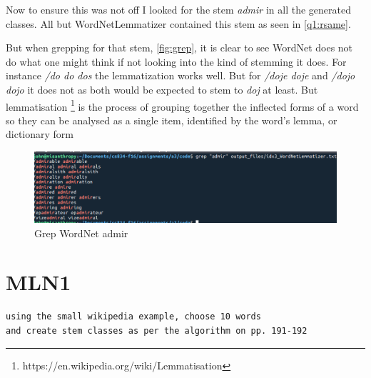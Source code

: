 \documentclass[11pt]{article}
\newenvironment{code}{\captionsetup{type=listing}}{}
\begin{document}

Now to ensure this was not off I looked for the stem \textit{admir} in all the generated classes. All but WordNetLemmatizer contained this stem as seen in \autoref{q1:rsame}.

But when grepping for that stem, \autoref{fig:grep}, it is clear to see WordNet does not do what one might think if not looking into the kind of stemming it does. For instance \textit{/do do dos} the lemmatization works well. But for \textit{/doje doje} and \textit{/dojo dojo} it does not as both would be expected to stem to \textit{doj} at least. But lemmatisation \footnote{https://en.wikipedia.org/wiki/Lemmatisation} is the process of grouping together the inflected forms of a word so they can be analysed as a single item, identified by the word's lemma, or dictionary form  
\begin{figure}[H]
\centering
\includegraphics[scale=0.5]{grepOutput.png}
\caption{Grep WordNet admir}
\label{fig:grep}
\end{figure}
\newpage
\begin{code}
 \label{code:idxr}
\end{code}
\begin{code}
 \label{code:scd}
\end{code}
\newpage
\section{MLN1}
\begin{verbatim}
using the small wikipedia example, choose 10 words 
and create stem classes as per the algorithm on pp. 191-192
\end{verbatim}
\end{document}
